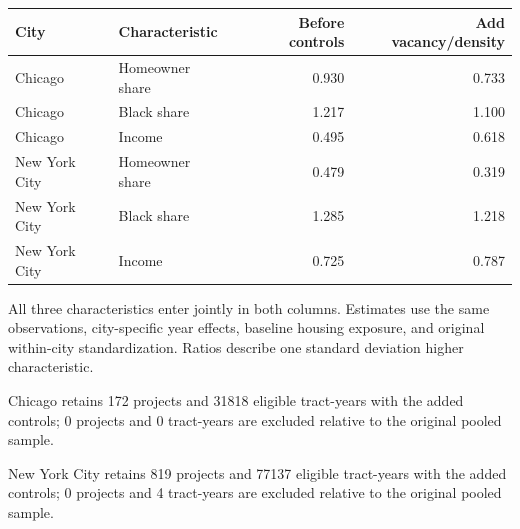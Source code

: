 \begin{center}\begin{tabular}{llrr}\hline
City & Characteristic & Before controls & Add vacancy/density \\ \hline
Chicago & Homeowner share & 0.930 & 0.733 \\
Chicago & Black share & 1.217 & 1.100 \\
Chicago & Income & 0.495 & 0.618 \\
New York City & Homeowner share & 0.479 & 0.319 \\
New York City & Black share & 1.285 & 1.218 \\
New York City & Income & 0.725 & 0.787 \\
\hline\end{tabular}\end{center}
All three characteristics enter jointly in both columns. Estimates use the same observations, city-specific year effects, baseline housing exposure, and original within-city standardization. Ratios describe one standard deviation higher characteristic.\par
Chicago retains 172 projects and 31818 eligible tract-years with the added controls; 0 projects and 0 tract-years are excluded relative to the original pooled sample.\par
New York City retains 819 projects and 77137 eligible tract-years with the added controls; 0 projects and 4 tract-years are excluded relative to the original pooled sample.\par
